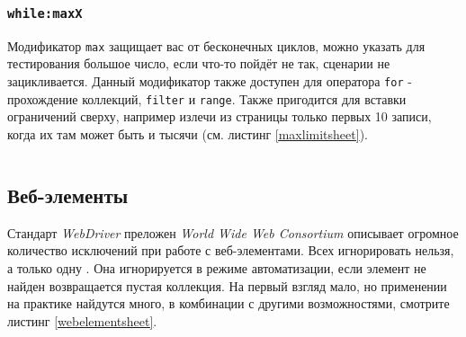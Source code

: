 \subsubsection{\texttt{while:maxX}}

Модификатор \texttt{max} защищает вас от бесконечных циклов, можно указать для тестирования большое число, если что-то пойдёт не так, сценарии не зацикливается. Данный модификатор также доступен для оператора \texttt{for} - прохождение коллекций, \texttt{filter} и \texttt{range}. Также пригодится для вставки ограничений сверху, например излечи из страницы только первых 10 записи, когда их там может быть и тысячи (см. листинг \ref{maxlimitsheet}).

\begin{sourcecode}
	\label{maxlimitsheet}
    \inputminted[linenos]{icl}{../sources/maxlimitsheet.icL}
\end{sourcecode}

\vspace{-1em}

\subsection{Веб-элементы}

Стандарт \textit{WebDriver} преложен \textit{World Wide Web Consortium} описывает огромное количество исключений при работе с веб-элементами. Всех игнорировать нельзя, а только одну . Она игнорируется в режиме автоматизации, если элемент не найден возвращается пустая коллекция. На первый взгляд мало, но применении на практике найдутся много, в комбинации с другими возможностями, смотрите листинг \ref{webelementsheet}.

\begin{sourcecode}
	\label{webelementsheet}
    \inputminted[linenos,firstline=3,firstnumber=1]{icl}{../sources/webelementsheet.icL}
\end{sourcecode}


